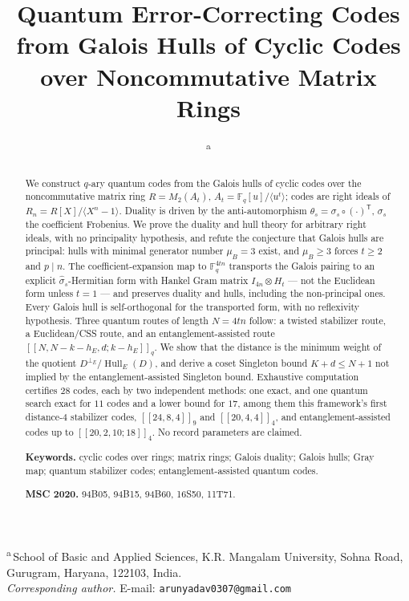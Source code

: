\documentclass[11pt,a4paper]{article}
\title{Quantum Error-Correcting Codes from Galois Hulls of Cyclic
       Codes over Noncommutative Matrix Rings}
\author{\AUTHORONE\textsuperscript{a}}
\date{}
\makeatletter
\newcommand{\AUTHORONEINST}{School of Basic and Applied Sciences}
\newcommand{\AUTHORONEORG}{K.R. Mangalam University}
\newcommand{\AUTHORONEADDR}{Sohna Road, Gurugram, Haryana, 122103}
\newcommand{\AUTHORONECOUNTRY}{India}
\newcommand{\CORRESPONDINGEMAIL}{arunyadav0307@gmail.com}
\newcommand{\F}{\mathbb F}
\newcommand{\Hull}{\operatorname{Hull}}
\newcommand{\MU}{\mu}
\theoremstyle{plain}
\theoremstyle{definition}
\theoremstyle{remark}
\newcommand{\AFFILIATIONBLOCK}{%
  \begin{center}\small
  \textsuperscript{a}\,\AUTHORONEINST, \AUTHORONEORG,
  \AUTHORONEADDR, \AUTHORONECOUNTRY.\\[2pt]
  \textit{Corresponding author.} E-mail: \texttt{\CORRESPONDINGEMAIL}
  \end{center}}
\makeatother
\begin{document}
\maketitle
\AFFILIATIONBLOCK

\begin{abstract}
We construct $q$-ary quantum codes from the Galois hulls of cyclic codes over
the noncommutative matrix ring $R=M_2(A_t)$,
$A_t=\F_q[u]/\langle u^t\rangle$; codes are right ideals of
$R_n=R[X]/\langle X^n-1\rangle$.  Duality is driven by the anti-automorphism
$\theta_s=\sigma_s\circ(\cdot)^{\mathsf T}$, $\sigma_s$ the coefficient
Frobenius.  We prove the duality and hull theory for arbitrary right ideals,
with no principality hypothesis, and refute the conjecture that Galois hulls
are principal: hulls with minimal generator number $\MU_B=3$ exist, and
$\MU_B\ge3$ forces $t\ge2$ and $p\mid n$.  The coefficient-expansion map to
$\F_q^{4tn}$ transports the Galois pairing to an explicit
$\widehat\sigma_s$-Hermitian form with Hankel Gram matrix
$I_{4n}\otimes H_t$ --- not the Euclidean form unless $t=1$ --- and preserves
duality and hulls, including the non-principal ones.  Every Galois hull is
self-orthogonal for the transported form, with no reflexivity hypothesis.
Three quantum routes of length $N=4tn$ follow: a twisted stabilizer route, a
Euclidean/CSS route, and an entanglement-assisted route
$[[N,N-k-h_E,d;k-h_E]]_q$.  We show that the distance is the minimum weight of
the quotient $D^{\perp_E}/\Hull_E(D)$, and derive a coset Singleton bound
$K+d\le N+1$ not implied by the entanglement-assisted Singleton bound.
Exhaustive computation certifies $28$ codes, each by two independent
methods: one exact, and one quantum search exact for $11$ codes and a
lower bound for $17$, among them this framework's first distance-$4$
stabilizer codes, $[[24,8,4]]_9$ and $[[20,4,4]]_4$, and entanglement-assisted
codes up to $[[20,2,10;18]]_4$.  No record parameters are claimed.

\smallskip
\noindent\textbf{Keywords.} cyclic codes over rings; matrix rings; Galois
duality; Galois hulls; Gray map; quantum stabilizer codes;
entanglement-assisted quantum codes.

\smallskip
\noindent\textbf{MSC 2020.} 94B05, 94B15, 94B60, 16S50, 11T71.
\end{abstract}

\tableofcontents
\bigskip











\end{document}
